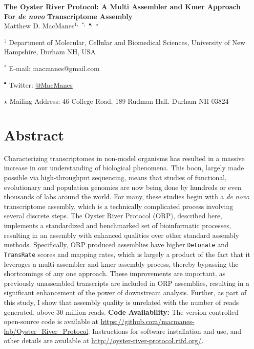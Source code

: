 \documentclass[10pt,letterpaper]{article}
\date{}
\begin{document}
\vspace*{0.35in}


\begin{flushleft}

{\Large
\textbf{The Oyster River Protocol: A Multi Assembler and Kmer Approach For \textit{de novo} Transcriptome Assembly }}
\\
Matthew D. MacManes$^{1,}$ $^{\ast,}$ $^{\bullet,}$ $^\star$

$^{1}$ Department of Molecular, Cellular and Biomedical Sciences, University of New Hampshire, Durham NH, USA

$^\ast$ E-mail: macmanes@gmail.com

$^\bullet$ Twitter: \href{http://twitter.com/macmanes}{@MacManes}

$\star$ Mailing Address: 46 College Road, 189 Rudman Hall. Durham NH 03824
\end{flushleft}


\newpage

\linenumbers

\section*{Abstract}

Characterizing transcriptomes in non-model organisms has resulted in a massive increase in our understanding of biological phenomena. This boon, largely made possible via high-throughput sequencing, means that studies of functional, evolutionary and population genomics are now being done by hundreds or even thousands of labs around the world. For many, these studies begin with a \textit{de novo} transcriptome assembly, which is a technically complicated process involving several discrete steps. The Oyster River Protocol (ORP), described here, implements a standardized and benchmarked set of bioinformatic processes, resulting in an assembly with enhanced qualities over other standard assembly methods. Specifically, ORP produced assemblies have higher \texttt{Detonate} and \texttt{TransRate} scores and mapping rates, which is largely a product of the fact that it leverages a multi-assembler and kmer assembly process, thereby bypassing the shortcomings of any one approach. These improvements are important, as previously unassembled transcripts are included in ORP assemblies, resulting in a significant enhancement of the power of downstream analysis. Further, as part of this study, I show that assembly quality is unrelated with the number of reads generated, above 30 million reads.  \textbf{Code Availability:} The version controlled open-source code is available at \url{https://github.com/macmanes-lab/Oyster_River_Protocol}.  Instructions for software installation and use, and other details are available at \url{http://oyster-river-protocol.rtfd.org/}.
\end{document}
